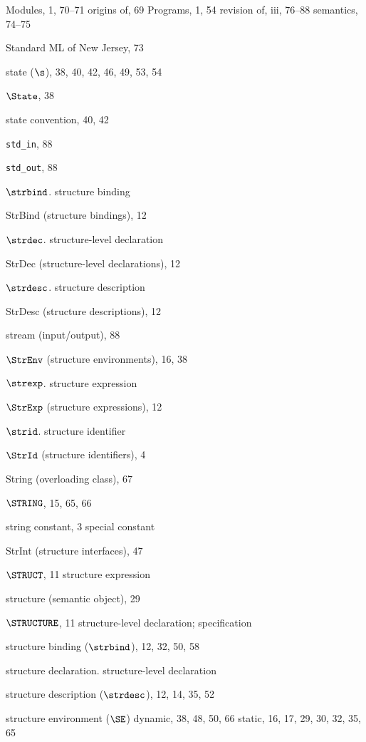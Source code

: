 \begin{theindex}
\subitem Modules, 1, 70--71
\subitem origins of, 69
\subitem Programs, 1, 54
\subitem revision of, iii, 76--88
\subitem semantics, 74--75
\item Standard ML of New Jersey, 73
\item state ($\s$), 38, 40, 42, 46, 49, 53, 54
\item $\State$, 38
\item state convention, 40, 42
\item \verb+std_in+, 88
\item \verb+std_out+, 88
\item $\strbind$. \see structure binding
\item StrBind (structure bindings), 12
\item $\strdec$. \see structure-level declaration
\item StrDec (structure-level declarations), 12
\item $\strdesc$. \see structure description
\item StrDesc (structure descriptions), 12
\item stream (input/output),  88
\item $\StrEnv$ (structure environments), 16, 38
\item $\strexp$. \see  structure expression
\item $\StrExp$ (structure expressions), 12
\item $\strid$. \see structure identifier
\item $\StrId$ (structure identifiers), 4
\item String (overloading class), 67
\item $\STRING$, 15, 65, 66
\item string constant, 3
\subitem \seealso special constant
\item StrInt (structure interfaces), 47
\item $\STRUCT$, 11
\subitem \seealso structure expression
\item structure (semantic object), 29
\item $\STRUCTURE$, 11
\subitem \seealso structure-level declaration; specification
\item structure binding ($\strbind$), 12, 32, 50, 58
\item structure declaration. \see structure-level declaration
\item structure description ($\strdesc$), 12, 14, 35, 52
\item structure environment ($\SE$) 
\subitem dynamic, 38, 48, 50, 66
\subitem static, 16,  17, 29, 30, 32, 35, 65

\end{theindex}
